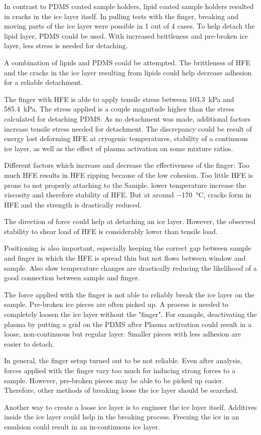 In contrast to PDMS coated sample holders, lipid coated sample holders resulted in cracks in the ice layer itself. In pulling tests with the finger, breaking and moving parts of the ice layer were possible in 1 out of 4 cases. To help detach the lipid layer, PDMS could be used. With increased brittleness and pre-broken ice layer, less stress is needed for detaching.

A combination of lipids and PDMS could be attempted. The brittleness of HFE and the cracks in the ice layer resulting from lipids could help decrease adhesion for a reliable detachment.

The finger with HFE is able to apply tensile stress between \SI{103.3}{\kilo\pascal} and \SI{585.4}{\kilo\pascal}. The stress applied is a couple magnitude higher than the stress calculated for detaching PDMS. As no detachment was made, additional factors increase tensile stress needed for detachment. The discrepancy could be result of energy lost deforming HFE at cryogenic temperatures, stability of a continuous ice layer, as well as the effect of plasma activation on some mixture ratios.

Different factors which increase and decrease the effectiveness of the finger: Too much HFE results in HFE ripping because of the low cohesion. Too little HFE is prone to not properly attaching to the Sample. lower temperature increase the viscosity and therefore stability of HFE. But at around \SI{-170}{\degreeCelsius}, cracks form in HFE and the strength is drastically reduced.

The direction of force could help at detaching an ice layer. However, the observed stability to shear load of HFE is considerably lower than tensile load.

Positioning is also important, especially keeping the correct gap between sample and finger in which the HFE is spread thin but not flows between window and sample. Also slow temperature changes are drastically reducing the likelihood of a good connection between sample and finger.

The force applied with the finger is not able to reliably break the ice layer on the sample. Pre-broken ice pieces are often picked up. A process is needed to completely loosen the ice layer without the "finger". For example, deactivating the plasma by putting a grid on the PDMS after Plasma activation could result in a loose, non-continuous but regular layer. Smaller pieces with less adhesion are easier to detach.

In general, the finger setup turned out to be not reliable. Even after analysis, forces applied with the finger vary too much for inducing strong forces to a sample. However, pre-broken pieces may be able to be picked up easier. Therefore, other methods of breaking loose the ice layer should be searched.

Another way to create a loose ice layer is to engineer the ice layer itself. Additives inside the ice layer could help in the breaking process. Freezing the ice in an emulsion could result in an in-continuous ice layer. 

